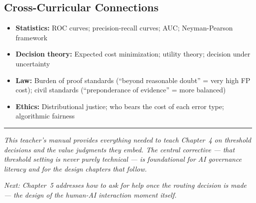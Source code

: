 \subsection{Cross-Curricular Connections}
\begin{itemize}
    \item \textbf{Statistics:} ROC curves; precision-recall curves; AUC; Neyman-Pearson framework
    \item \textbf{Decision theory:} Expected cost minimization; utility theory; decision under uncertainty
    \item \textbf{Law:} Burden of proof standards (``beyond reasonable doubt'' = very high FP cost); civil standards (``preponderance of evidence'' = more balanced)
    \item \textbf{Ethics:} Distributional justice; who bears the cost of each error type; algorithmic fairness
\end{itemize}

\bigskip
\begin{center}
\rule{0.5\textwidth}{0.4pt}
\end{center}
\bigskip

\noindent\textit{This teacher's manual provides everything needed to teach Chapter~4 on threshold decisions and the value judgments they embed. The central corrective --- that threshold setting is never purely technical --- is foundational for AI governance literacy and for the design chapters that follow.}

\medskip
\noindent\textit{Next: Chapter~5 addresses how to ask for help once the routing decision is made --- the design of the human-AI interaction moment itself.}
